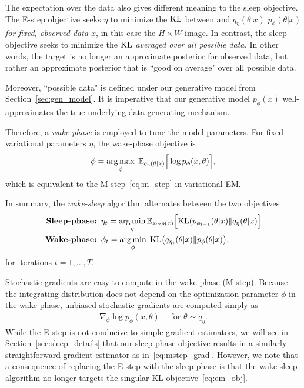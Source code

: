 The expectation over the data also gives different meaning to the sleep objective. The E-step objective seeks $\eta$ to minimize the $\textrm{KL}$ between and $q_\eta(\theta | x)$ $p_\phi(\theta | x)$ {\itshape for fixed, observed data $x$},
in this case the $H\times W$ image. In contrast, the sleep objective seeks to minimize the $\textrm{KL}$ {\itshape averaged over all possible data. } In other words, the target is no longer an approximate posterior for observed data, but rather an approximate posterior that is ``good on average" over all possible data.

Moreover, ``possible data" is defined under our generative model from Section~\ref{sec:gen_model}. It is imperative that our generative model $p_\phi(x)$ well-approximates the true underlying data-generating mechanism. 

Therefore, a {\itshape wake phase} is employed to tune the model parameters. For fixed variational parameters $\eta$, the wake-phase objective is
\begin{align}
    \phi = \operatorname*{arg\,max}_{\phi} \; \mathbb{E}_{q_{\eta}(\theta | x)}\Big[\log p_\phi(x, \theta)\Big], 
    \label{eq:wake_elbo}
\end{align}
which is equivalent to the M-step~\eqref{eq:m_step} in variational EM.

In summary, the {\itshape wake-sleep} algorithm alternates
between the two objectives 
\begin{align}
    \text{{\bf Sleep-phase: }} & 
    \eta_{t} = \operatorname*{arg\,min}_{\eta} \mathbb{E}_{x \sim p(x)}\Big[\textrm{KL}(p_{\phi_{t-1}}(\theta | x) \| q_\eta(\theta | x)\Big]
    \label{eq:sleep_phase_summary}
    \\
    \text{{\bf Wake-phase: }} & \phi_{t} = \operatorname*{arg\,min}_{\phi} \; \mathrm{KL}\big (q_{\eta_t}(\theta |x) \| p_{\phi}(\theta | x)\big), 
    \label{eq:wake_phase_summary}
\end{align} 
for iterations $t = 1, ..., T$. 

Stochastic gradients are easy to compute in the wake phase (M-step). Because the integrating distribution does not depend on the optimization parameter $\phi$ in the wake phase, unbiased stochastic gradients are computed simply as 
\begin{align}
    \nabla_\phi \log p_\phi(x, \theta) \quad \text{ for } \theta\sim q_\eta. 
    \label{eq:mstep_grad}
\end{align}
While the E-step is not conducive to simple gradient estimators, we will see in Section~\ref{sec:sleep_details} that our sleep-phase objective
results in a similarly straightforward gradient estimator as in~\eqref{eq:mstep_grad}. However,
we note that a consequence of replacing the E-step with the sleep phase is that the wake-sleep algorithm no longer targets the singular KL objective~\eqref{eq:em_obj}. 

